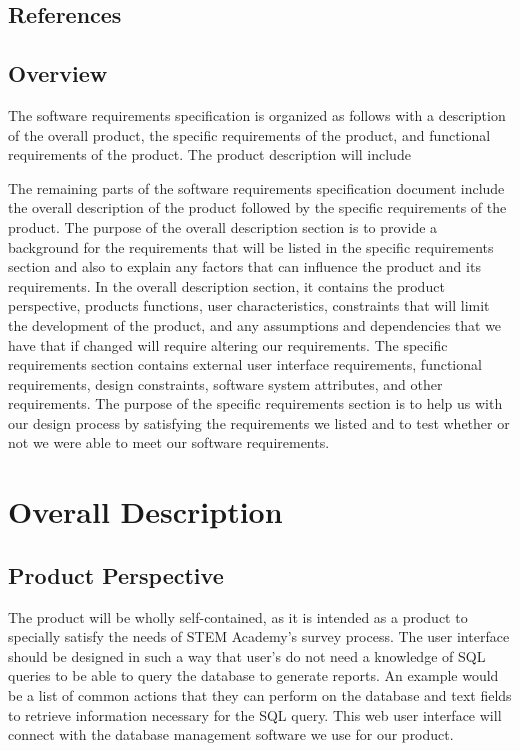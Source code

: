 \documentclass[letterpaper,10pt,titlepage, draftclsnofoot,onecolumn]{IEEEtran}
\begin{document}
\subsection{References}
\subsection{Overview}
The software requirements specification is organized as follows with a description of the overall product, the specific requirements of the
product, and functional requirements of the product. The product description will include %

The remaining parts of the software requirements specification document include the overall description of the product followed by the specific requirements of the product.
 The purpose of the overall description section is to provide a background for the requirements that will be listed in the specific requirements section and also to explain any factors that can influence the product and its requirements. 
 In the overall description section, it contains the product perspective, products functions, user characteristics, constraints that will limit the development of the product, and any assumptions and dependencies that we have that if changed will require altering our requirements. 
The specific requirements section contains external user interface requirements, functional requirements, design constraints, software system attributes, and other requirements. 
The purpose of the specific requirements section is to help us with our design process by satisfying the requirements we listed and to test whether or not we were able to meet our software requirements.  %
\section{Overall Description}

\subsection{Product Perspective}
The product will be wholly self-contained, as it is intended as a product to specially satisfy the needs of STEM Academy's survey
process. The user interface should be designed in such a way that user's do not need a knowledge of SQL queries to be able
to query the database to generate reports. An example would be a list of common actions that they can perform on the database
and text fields to retrieve information necessary for the SQL query. This web user interface will connect with the database management
software we use for our product.
\end{document}
